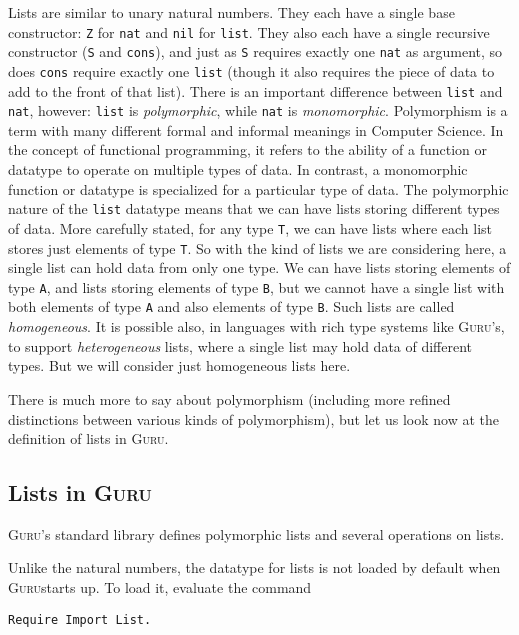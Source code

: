 \documentclass{book}[12pt]
\newcommand{\guru}[0]{\textsc{Guru}}
\begin{document}
Lists are similar to unary natural numbers.  They each have a single
base constructor: \texttt{Z} for \texttt{nat} and \texttt{nil} for
\texttt{list}.  They also each have a single recursive constructor
(\texttt{S} and \texttt{cons}), and just as \texttt{S} requires
exactly one \texttt{nat} as argument, so does \texttt{cons} require
exactly one \texttt{list} (though it also requires the piece of data
to add to the front of that list).  There is an important difference
between \texttt{list} and \texttt{nat}, however: \texttt{list} is
\emph{polymorphic}, while \texttt{nat} is \emph{monomorphic}.
Polymorphism is a term with many different formal and informal
meanings in Computer Science.  In the concept of functional
programming, it refers to the ability of a function or datatype to
operate on multiple types of data.  In contrast, a monomorphic
function or datatype is specialized for a particular type of data.
The polymorphic nature of the \texttt{list} datatype means that we can
have lists storing different types of data.  More carefully stated,
for any type \texttt{T}, we can have lists where each list stores just
elements of type \texttt{T}.  So with the kind of lists we are
considering here, a single list can hold data from only one type.  We
can have lists storing elements of type \texttt{A}, and lists storing
elements of type \texttt{B}, but we cannot have a single list with
both elements of type \texttt{A} and also elements of type \texttt{B}.
Such lists are called \emph{homogeneous}.  It is possible also, in
languages with rich type systems like \guru's, to support
\emph{heterogeneous} lists, where a single list may hold data of
different types.  But we will consider just homogeneous lists here.

There is much more to say about polymorphism (including more refined
distinctions between various kinds of polymorphism), but let us look
now at the definition of lists in \guru.

\subsection{Lists in \guru}

\guru's standard library defines polymorphic lists and several
operations on lists.  

Unlike the natural numbers, the datatype for
lists is not loaded by default when \guru starts up.  To load it,
evaluate the command

\begin{verbatim}
Require Import List.
\end{verbatim}
\end{document}
